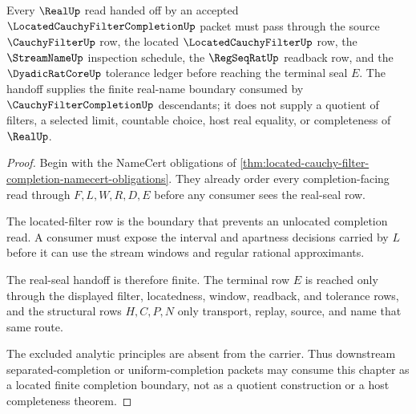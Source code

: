 \begin{theorem}
\label{thm:located-cauchy-filter-completion-real-seal-handoff}
Every $\RealUp$ read handed off by an accepted $\LocatedCauchyFilterCompletionUp$ packet must pass through the source $\CauchyFilterUp$ row, the located $\LocatedCauchyFilterUp$ row, the $\StreamNameUp$ inspection schedule, the $\RegSeqRatUp$ readback row, and the $\DyadicRatCoreUp$ tolerance ledger before reaching the terminal seal $E$. The handoff supplies the finite real-name boundary consumed by $\CauchyFilterCompletionUp$ descendants; it does not supply a quotient of filters, a selected limit, countable choice, host real equality, or completeness of $\RealUp$.
\end{theorem}
\begin{proof}
Begin with the NameCert obligations of \autoref{thm:located-cauchy-filter-completion-namecert-obligations}. They already order every completion-facing read through $F,L,W,R,D,E$ before any consumer sees the real-seal row.

The located-filter row is the boundary that prevents an unlocated completion read. A consumer must expose the interval and apartness decisions carried by $L$ before it can use the stream windows and regular rational approximants.

The real-seal handoff is therefore finite. The terminal row $E$ is reached only through the displayed filter, locatedness, window, readback, and tolerance rows, and the structural rows $H,C,P,N$ only transport, replay, source, and name that same route.

The excluded analytic principles are absent from the carrier. Thus downstream separated-completion or uniform-completion packets may consume this chapter as a located finite completion boundary, not as a quotient construction or a host completeness theorem.
\end{proof}


